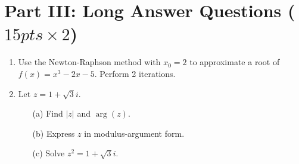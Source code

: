 \documentclass[12pt]{article}
\begin{document}
\section*{Part III: Long Answer Questions ($15 pts \times 2$)}
\begin{enumerate}
\item 
Use the Newton-Raphson method with $ x_0 = 2 $ to approximate a root of $ f(x) = x^3 - 2x - 5 $. Perform 2 iterations.

\vspace{8cm} %

\item 
Let $ z = 1 + \sqrt{3}i $.  
\begin{enumerate}
\item[(a)] Find $ |z| $ and $ \arg(z) $.

\vspace{3cm} %

\item[(b)] Express $ z $ in modulus-argument form.

\vspace{3cm} %

\item[(c)] Solve $ z^2 = 1 + \sqrt{3}i $.

\vspace{3cm} %
\end{enumerate}
\end{enumerate}
\end{document}
